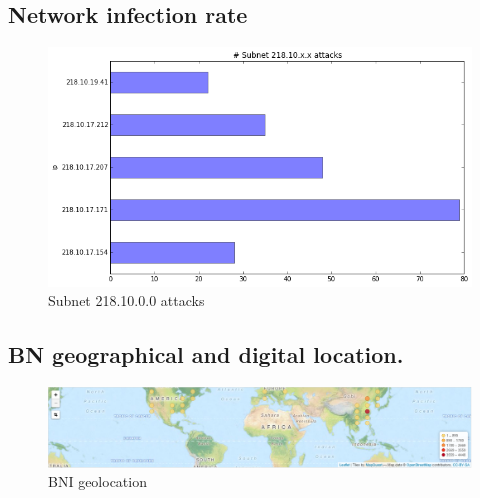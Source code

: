 \subsection{Network infection rate}
\begin{figure}[h]
    \caption{Subnet 218.10.0.0 attacks}
    \centering
        \includegraphics[width=0.9\linewidth]{images/subnet}
\end{figure}

\subsection{BN geographical and digital location.}
\begin{figure}[h]
\caption{BNI geolocation~\cite{map}}
\centering
    \includegraphics[width=0.9\linewidth]{images/map}
\end{figure}


